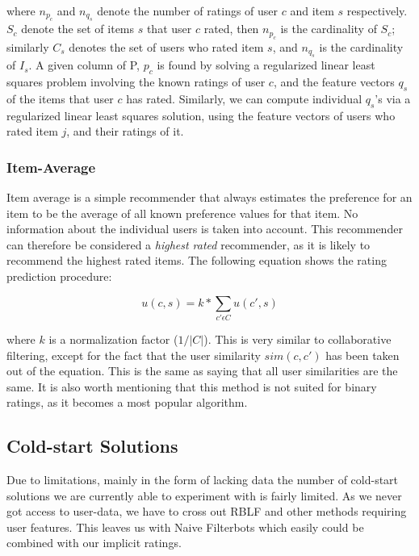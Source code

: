 where $n_{p_{c}}$ and $n_{q_{s}}$ denote the number of ratings of user $c$ and item $s$ respectively. $S_{c}$ denote
the set of items $s$ that user $c$ rated, then $n_{p_{c}}$ is the cardinality of $S_{c}$; similarly $C_{s}$ denotes
the set of users who rated item $s$, and $n_{q_{s}}$ is the cardinality of $I_{s}$. A given column of P, $p_{c}$ is
found by solving a regularized linear least squares problem involving the known ratings of user $c$, and the
feature vectors $q_{s}$ of the items that user $c$ has rated. Similarly, we can compute individual $q_{s}$'s via
a regularized linear least squares solution, using the feature vectors of users who rated item $j$, and their ratings of it.


\subsubsection{Item-Average}

Item average is a simple recommender that always estimates the preference for an item to be the average of
all known preference values for that item. No information about the individual users is taken into account.
This recommender can therefore be considered a \emph{highest rated} recommender, as it is likely to recommend
the highest rated items. The following equation shows the rating prediction procedure:

\begin{equation}
\label{equation:itemaverageratingprediction}
u(c,s) = k * \sum_{c' \epsilon C} u(c',s)
\end{equation}


where $k$ is a normalization factor ($1/|C|$). This is very similar to collaborative filtering, except for
the fact that the user similarity $sim(c, c')$ has been taken out of the equation. This is the same as saying
that all user similarities are the same. It is also worth mentioning that this method is not suited for binary
ratings, as it becomes a most popular algorithm.

\subsection{Cold-start Solutions}

Due to limitations, mainly in the form of lacking data the number of cold-start solutions
we are currently able to experiment with is fairly limited. As we never got access to
user-data, we have to cross out RBLF and other methods requiring user features. This leaves us with
Naive Filterbots \cite{Park2006} which easily could be combined with our implicit ratings.

